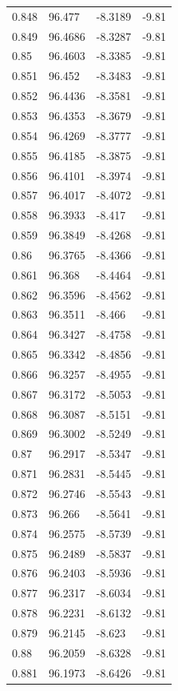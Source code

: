 \begin{tabular}{llll}
0.848 & 96.477 & -8.3189 & -9.81 \\
0.849 & 96.4686 & -8.3287 & -9.81 \\
0.85 & 96.4603 & -8.3385 & -9.81 \\
0.851 & 96.452 & -8.3483 & -9.81 \\
0.852 & 96.4436 & -8.3581 & -9.81 \\
0.853 & 96.4353 & -8.3679 & -9.81 \\
0.854 & 96.4269 & -8.3777 & -9.81 \\
0.855 & 96.4185 & -8.3875 & -9.81 \\
0.856 & 96.4101 & -8.3974 & -9.81 \\
0.857 & 96.4017 & -8.4072 & -9.81 \\
0.858 & 96.3933 & -8.417 & -9.81 \\
0.859 & 96.3849 & -8.4268 & -9.81 \\
0.86 & 96.3765 & -8.4366 & -9.81 \\
0.861 & 96.368 & -8.4464 & -9.81 \\
0.862 & 96.3596 & -8.4562 & -9.81 \\
0.863 & 96.3511 & -8.466 & -9.81 \\
0.864 & 96.3427 & -8.4758 & -9.81 \\
0.865 & 96.3342 & -8.4856 & -9.81 \\
0.866 & 96.3257 & -8.4955 & -9.81 \\
0.867 & 96.3172 & -8.5053 & -9.81 \\
0.868 & 96.3087 & -8.5151 & -9.81 \\
0.869 & 96.3002 & -8.5249 & -9.81 \\
0.87 & 96.2917 & -8.5347 & -9.81 \\
0.871 & 96.2831 & -8.5445 & -9.81 \\
0.872 & 96.2746 & -8.5543 & -9.81 \\
0.873 & 96.266 & -8.5641 & -9.81 \\
0.874 & 96.2575 & -8.5739 & -9.81 \\
0.875 & 96.2489 & -8.5837 & -9.81 \\
0.876 & 96.2403 & -8.5936 & -9.81 \\
0.877 & 96.2317 & -8.6034 & -9.81 \\
0.878 & 96.2231 & -8.6132 & -9.81 \\
0.879 & 96.2145 & -8.623 & -9.81 \\
0.88 & 96.2059 & -8.6328 & -9.81 \\
0.881 & 96.1973 & -8.6426 & -9.81 \\

\end{tabular}
